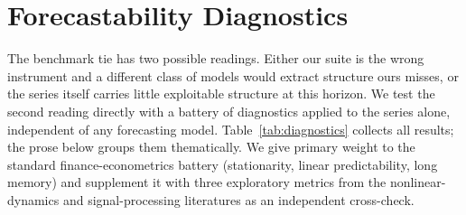 \documentclass[conference]{IEEEtran}
\begin{document}
\section{Forecastability Diagnostics}
\label{sec:forecastability}

The benchmark tie has two possible readings. Either our suite is the
wrong instrument and a different class of models would extract
structure ours misses, or the series itself carries little
exploitable structure at this horizon. We test the second reading
directly with a battery of diagnostics applied to the series alone,
independent of any forecasting model. Table~\ref{tab:diagnostics}
collects all results; the prose below groups them thematically. We
give primary weight to the standard finance-econometrics battery
(stationarity, linear predictability, long memory) and supplement it
with three exploratory metrics from the nonlinear-dynamics and
signal-processing literatures as an independent cross-check.
\end{document}

